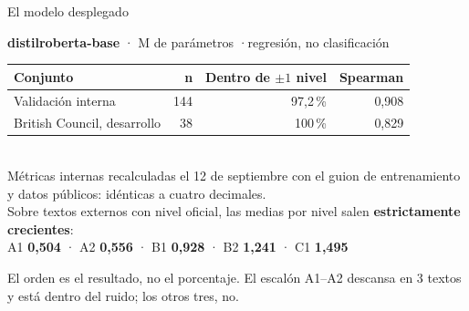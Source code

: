 \documentclass[aspectratio=169,11pt]{beamer}
\begin{document}
\begin{frame}{El modelo desplegado}
\vspace{4mm}
\begin{center}
{\large\bfseries\color{llazul} distilroberta-base} \quad· M de parámetros \quad·\quad regresión, no clasificación\\[6mm]

\begin{tabular}{@{}l r r r@{}}
\toprule
\textbf{Conjunto} & \textbf{n} & \textbf{Dentro de $\pm 1$ nivel} & \textbf{Spearman} \\
\midrule
Validación interna & 144 & 97,2\,\% & 0,908 \\
British Council, desarrollo & 38 & 100\,\% & 0,829 \\
\bottomrule
\end{tabular}\\[3mm]
{\scriptsize\color{llgris} Métricas internas recalculadas el 12 de septiembre con el
guion de entrenamiento y datos públicos: idénticas a cuatro decimales.}
\\[3mm]

{\small Sobre textos externos con nivel oficial, las medias por nivel salen
\textbf{estrictamente crecientes}:}\\[3mm]
{\small A1 \textbf{0,504} \; · \; A2 \textbf{0,556} \; · \; B1 \textbf{0,928}
\; · \; B2 \textbf{1,241} \; · \; C1 \textbf{1,495}}
\end{center}

\vspace{3mm}
{\footnotesize\color{llgris} El orden es el resultado, no el porcentaje. El
escalón A1--A2 descansa en 3 textos y está dentro del ruido; los otros tres,
no.}
\end{frame}
\end{document}
